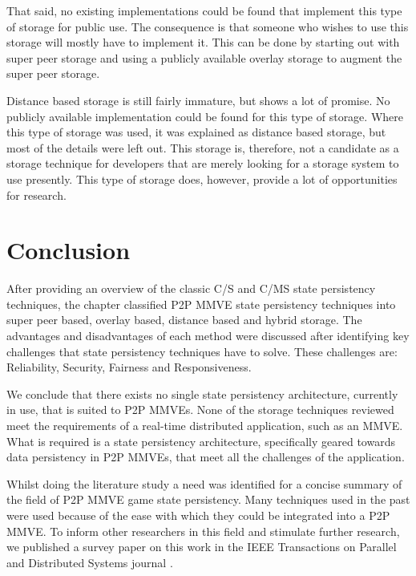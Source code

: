 That said, no existing implementations could be found that implement this type of storage for public use. The consequence is that someone who wishes to use this storage will mostly have to implement it. This can be done by starting out with super peer storage and using a publicly available overlay storage to augment the super peer storage.

Distance based storage is still fairly immature, but shows a lot of promise. No publicly available implementation could be found for this type of storage. Where this type of storage was used, it was explained as distance based storage, but most of the details were left out. This storage is, therefore, not a candidate as a storage technique for developers that are merely looking for a storage system to use presently. This type of storage does, however, provide a lot of opportunities for research.

\section{Conclusion}
\label{conclusion}

After providing an overview of the classic C/S and C/MS state persistency techniques, the chapter classified P2P MMVE state persistency techniques into super peer based, overlay based, distance based and hybrid storage. The advantages and disadvantages of each method were discussed after identifying key challenges that state persistency techniques have to solve. These challenges are: Reliability, Security, Fairness and Responsiveness.

We conclude that there exists no single state persistency architecture, currently in use, that is suited to P2P MMVEs. None of the storage techniques reviewed meet the requirements of a real-time distributed application, such as an MMVE. What is required is a state persistency architecture, specifically geared towards data persistency in P2P MMVEs, that meet all the challenges of the application.

Whilst doing the literature study a need was identified for a concise summary of the field of P2P MMVE game state persistency. Many techniques used in the past were used because of the ease with which they could be integrated into a P2P MMVE. To inform other researchers in this field and stimulate further research, we published a survey paper on this work in the IEEE Transactions on Parallel and Distributed Systems journal \cite{gilmore_p2p_mmog_state_persistency}.
